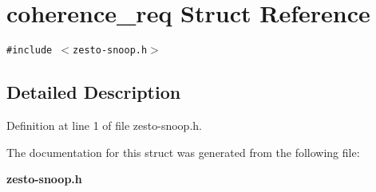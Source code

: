 \section{coherence\_\-req Struct Reference}
\label{structcoherence__req}
{\tt \#include $<$zesto-snoop.h$>$}



\subsection{Detailed Description}


Definition at line 1 of file zesto-snoop.h.

The documentation for this struct was generated from the following file:\begin{CompactItemize}
\item 
{\bf zesto-snoop.h}\end{CompactItemize}
